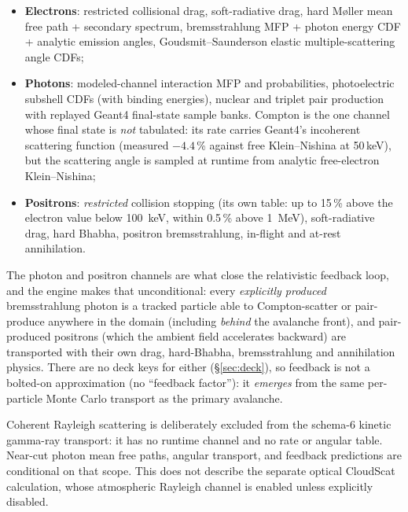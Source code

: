 \documentclass[11pt]{article}
\begin{document}
\begin{itemize}
  \item \textbf{Electrons}: restricted collisional drag,
  soft-radiative drag, hard M{\o}ller mean free path + secondary spectrum,
  bremsstrahlung MFP + photon energy CDF + analytic emission angles,
  Goudsmit--Saunderson elastic multiple-scattering angle CDFs;
  \item \textbf{Photons}: modeled-channel interaction MFP and probabilities,
  photoelectric subshell CDFs (with binding energies),
  nuclear and triplet pair production with replayed Geant4 final-state sample banks.
  Compton is the one channel whose final state is \emph{not} tabulated: its
  rate carries Geant4's incoherent scattering function (measured
  $-4.4$\,\% against free Klein--Nishina at 50\,keV), but the scattering
  angle is sampled at runtime from analytic free-electron Klein--Nishina;
  \item \textbf{Positrons}: \emph{restricted} collision stopping (its own table:
  up to 15\,\% above the electron value below 100~keV, within 0.5\,\% above
  1~MeV), soft-radiative drag,
  hard Bhabha, positron bremsstrahlung, in-flight and at-rest annihilation.
\end{itemize}

The photon and positron channels are what close the relativistic feedback
loop, and the engine makes that unconditional: every \emph{explicitly
produced} bremsstrahlung photon is a tracked particle able to Compton-scatter
or pair-produce anywhere in the domain (including \emph{behind} the avalanche
front), and pair-produced positrons (which the ambient field accelerates
backward) are transported with their own drag, hard-Bhabha, bremsstrahlung
and annihilation physics. There are no deck keys for either
(\S\ref{sec:deck}), so feedback is not a bolted-on approximation (no
``feedback factor''): it \emph{emerges} from the same per-particle Monte
Carlo transport as the primary avalanche.

Coherent Rayleigh scattering is deliberately excluded from the schema-6
kinetic gamma-ray transport: it has no runtime channel and no rate or angular
table. Near-cut photon mean free paths, angular transport, and feedback
predictions are conditional on that scope. This does not describe the separate
optical CloudScat calculation, whose atmospheric Rayleigh channel is enabled
unless explicitly disabled.
\end{document}
